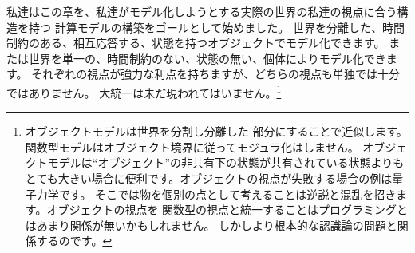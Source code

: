 私達はこの章を、私達がモデル化しようとする実際の世界の私達の視点に合う構造を持つ
計算モデルの構築をゴールとして始めました。
世界を分離した、時間制約のある、相互応答する、状態を持つオブジェクトでモデル化できます。
または世界を単一の、時間制約のない、状態の無い、個体によりモデル化できます。
それぞれの視点が強力な利点を持ちますが、どちらの視点も単独では十分ではありません。
大統一は未だ現われてはいません。\footnote{オブジェクトモデルは世界を分割し分離した
部分にすることで近似します。関数型モデルはオブジェクト境界に従ってモジュラ化はしません。
オブジェクトモデルは``オブジェクト''の非共有下の状態が共有されている状態よりも
とても大きい場合に便利です。オブジェクトの視点が失敗する場合の例は量子力学です。
そこでは物を個別の点として考えることは逆説と混乱を招きます。オブジェクトの視点を
関数型の視点と統一することはプログラミングとはあまり関係が無いかもしれません。
しかしより根本的な認識論の問題と関係するのです。}
